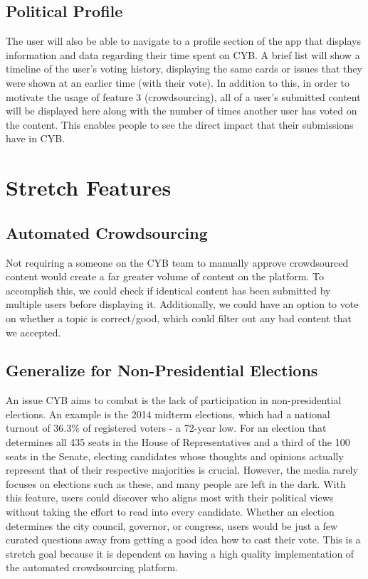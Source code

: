 \documentclass[11pt]{article}
\begin{document}
\subsection{Political Profile}

The user will also be able to navigate to a profile section of the app that displays information and data regarding their time spent on CYB. A brief list will show a timeline of the user's voting history, displaying the same cards or issues that they were shown at an earlier time (with their vote). In addition to this, in order to motivate the usage of feature 3 (crowdsourcing), all of a user's submitted content will be displayed here along with the number of times another user has voted on the content. This enables people to see the direct impact that their submissions have in CYB.

\section*{Stretch Features}

\subsection{Automated Crowdsourcing}

Not requiring a someone on the CYB team to manually approve crowdsourced content would create a far greater volume of content on the platform. To accomplish this, we could check if identical content has been submitted by multiple users before displaying it. Additionally, we could have an option to vote on whether a topic is correct/good, which could filter out any bad content that we accepted.

\subsection{Generalize for Non-Presidential Elections}

An issue CYB aims to combat is the lack of participation in non-presidential elections. An example is the 2014 midterm elections, which had a national turnout of 36.3\% of registered voters - a 72-year low. For an election that determines all 435 seats in the House of Representatives and a third of the 100 seats in the Senate, electing candidates whose thoughts and opinions actually represent that of their respective majorities is crucial. However, the media rarely focuses on elections such as these, and many people are left in the dark. With this feature, users could discover who aligns most with their political views without taking the effort to read into every candidate. Whether an election determines the city council, governor, or congress, users would be just a few curated questions away from getting a good idea how to cast their vote. This is a stretch goal because it is dependent on having a high quality implementation of the automated crowdsourcing platform.
\end{document}
